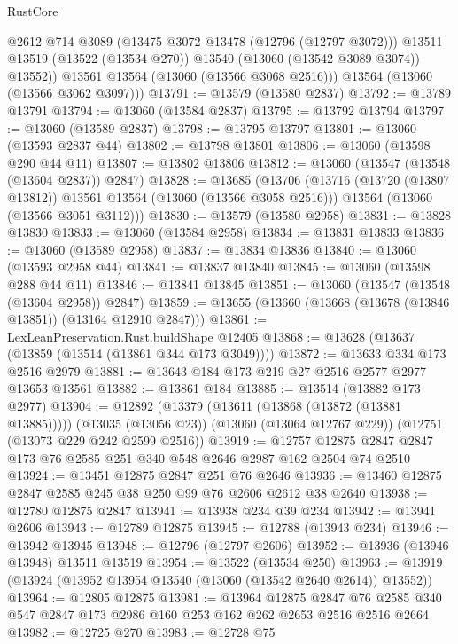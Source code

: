 \begin{lexlean}{RustCore}
\begin{coremodule}
            @2612
            @714
            @3089
            (@13475 @3072 @13478 (@12796 (@12797 @3072)))
            @13511
            @13519
            (@13522 (@13534 @270))
            @13540
            (@13060 (@13542 @3089 @3074))
            @13552))
        @13561
        @13564
        (@13060 (@13566 @3068 @2516)))
      @13564
      (@13060 (@13566 @3062 @3097)))
@13791 := @13579 (@13580 @2837)
@13792 := @13789 @13791
@13794 := @13060 (@13584 @2837)
@13795 := @13792 @13794
@13797 := @13060 (@13589 @2837)
@13798 := @13795 @13797
@13801 := @13060 (@13593 @2837 @44)
@13802 := @13798 @13801
@13806 := @13060 (@13598 @290 @44 @11)
@13807 := @13802 @13806
@13812 := @13060 (@13547 (@13548 (@13604 @2837)) @2847)
@13828 := @13685
    (@13706
      (@13716 (@13720 (@13807 @13812)) @13561 @13564 (@13060 (@13566 @3058 @2516)))
      @13564
      (@13060 (@13566 @3051 @3112)))
@13830 := @13579 (@13580 @2958)
@13831 := @13828 @13830
@13833 := @13060 (@13584 @2958)
@13834 := @13831 @13833
@13836 := @13060 (@13589 @2958)
@13837 := @13834 @13836
@13840 := @13060 (@13593 @2958 @44)
@13841 := @13837 @13840
@13845 := @13060 (@13598 @288 @44 @11)
@13846 := @13841 @13845
@13851 := @13060 (@13547 (@13548 (@13604 @2958)) @2847)
@13859 := @13655 (@13660 (@13668 (@13678 (@13846 @13851)) (@13164 @12910 @2847)))
@13861 := LexLeanPreservation.Rust.buildShape @12405
@13868 := @13628 (@13637 (@13859 (@13514 (@13861 @344 @173 @3049))))
@13872 := @13633 @334 @173 @2516 @2979
@13881 := @13643 @184 @173 @219 @27 @2516 @2577 @2977 @13653 @13561
@13882 := @13861 @184
@13885 := @13514 (@13882 @173 @2977)
@13904 := @12892
    (@13379 (@13611 (@13868 (@13872 (@13881 @13885)))))
    (@13035 (@13056 @23))
    (@13060 (@13064 @12767 @229))
    (@12751 (@13073 @229 @242 @2599 @2516))
@13919 := @12757 @12875 @2847 @2847 @173 @76 @2585 @251 @340 @548 @2646 @2987 @162 @2504 @74 @2510
@13924 := @13451 @12875 @2847 @251 @76 @2646
@13936 := @13460 @12875 @2847 @2585 @245 @38 @250 @99 @76 @2606 @2612 @38 @2640
@13938 := @12780 @12875 @2847
@13941 := @13938 @234 @39 @234
@13942 := @13941 @2606
@13943 := @12789 @12875
@13945 := @12788 (@13943 @234)
@13946 := @13942 @13945
@13948 := @12796 (@12797 @2606)
@13952 := @13936 (@13946 @13948) @13511 @13519
@13954 := @13522 (@13534 @250)
@13963 := @13919 (@13924 (@13952 @13954 @13540 (@13060 (@13542 @2640 @2614)) @13552))
@13964 := @12805 @12875
@13981 := @13964
    @12875
    @2847
    @76
    @2585
    @340
    @547
    @2847
    @173
    @2986
    @160
    @253
    @162
    @262
    @2653
    @2516
    @2516
    @2664
@13982 := @12725 @270
@13983 := @12728 @75

\end{coremodule}
\end{lexlean}
